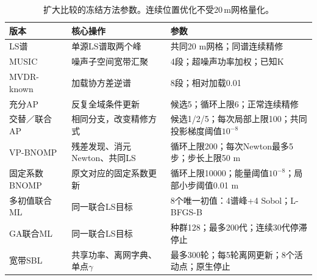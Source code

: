 \begin{table}[htbp]\centering\footnotesize
\caption{扩大比较的冻结方法参数。连续位置优化不受20\,m网格量化。}\label{tab:parameters}
\begin{tabularx}{\linewidth}{@{}p{.18\linewidth}p{.27\linewidth}X@{}}\toprule
版本 & 核心操作 & 参数\\\midrule
LS谱 & 单源LS谱取两个峰 & 共同20 m网格；同谱连续精修\\
MUSIC & 噪声子空间宽带汇聚 & 4段；超噪声功率加权；已知K\\
MVDR-known & 加载协方差逆谱 & 8段；相对加载0.01\\
充分AP & 反复全域条件更新 & 候选5；循环上限6；正常连续精修\\
交替／联合AP & 相同分支，改变精修方式 & 候选1/2/5；每次局部上限100；共同投影梯度阈值$10^{-8}$\\
VP-BNOMP & 残差发现、消元Newton、共同LS & 循环上限200；每次Newton最多5步；步长上限50 m\\
固定系数BNOMP & 原文对应的固定系数更新 & 循环上限10000；能量阈值$10^{-8}$；局部小步阈值0.01 m\\
多初值联合ML & 同一联合LS目标 & 8个唯一初值：4谱峰+4 Sobol；L-BFGS-B\\
GA联合ML & 同一联合LS目标 & 种群128；最多200代；连续30代停滞停止\\
宽带SBL & 共享功率、离网字典、单点$\gamma$ & 最多300轮；每5轮离网更新；8个活动点；原生停止\\
\bottomrule\end{tabularx}\end{table}
